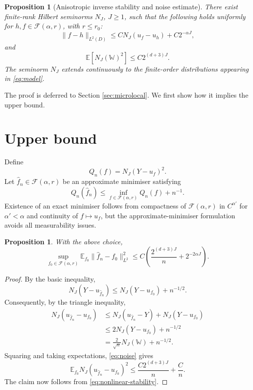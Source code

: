 \documentclass[11pt,a4paper]{article}
\newtheorem{proposition}[theorem]{Proposition}
\theoremstyle{remark}
\numberwithin{equation}{section}
\newcommand{\E}{\mathbb{E}}
\newcommand{\W}{\mathbb{W}}
\newcommand{\Fcal}{\mathcal F}
\begin{document}
\begin{proposition}[Anisotropic inverse stability and noise estimate]
\label{prop:anisotropic}
There exist finite-rank Hilbert seminorms $N_J$, $J\geq 1$, such that the
following holds uniformly for $h,f\in\Fcal(\alpha,r)$, with $r\leq r_0$:
\begin{equation}\label{eq:nonlinear-stability}
\|f-h\|_{L^2(D)}
\leq
C N_J(u_f-u_h)+C2^{-\alpha J},
\end{equation}
and
\begin{equation}\label{eq:noise}
\E\!\left[N_J(\W)^2\right]\leq C2^{(d+3)J}.
\end{equation}
The seminorm $N_J$ extends continuously to the finite-order distributions
appearing in \eqref{eq:model}.
\end{proposition}

The proof is deferred to Section \ref{sec:microlocal}. We first show how it
implies the upper bound.

\section{Upper bound}

Define
\[
Q_n(f)=N_J(Y-u_f)^2.
\]
Let $\widehat f_n\in\Fcal(\alpha,r)$ be an approximate minimiser satisfying
\[
Q_n(\widehat f_n)\leq \inf_{f\in\Fcal(\alpha,r)}Q_n(f)+n^{-1}.
\]
Existence of an exact minimiser follows from compactness of
$\Fcal(\alpha,r)$ in $C^{\alpha'}$ for $\alpha'<\alpha$ and continuity of
$f\mapsto u_f$, but the approximate-minimiser formulation avoids all
measurability issues.

\begin{proposition}\label{prop:upper}
With the above choice,
\[
\sup_{f_0\in\Fcal(\alpha,r)}
\E_{f_0}\|\widehat f_n-f_0\|_{L^2}^2
\leq
C\left(
\frac{2^{(d+3)J}}n+2^{-2\alpha J}
\right).
\]
\end{proposition}

\begin{proof}
By the basic inequality,
\[
N_J(Y-u_{\widehat f_n})
\leq
N_J(Y-u_{f_0})+n^{-1/2}.
\]
Consequently, by the triangle inequality,
\begin{align*}
N_J(u_{\widehat f_n}-u_{f_0})
&\leq
N_J(u_{\widehat f_n}-Y)+N_J(Y-u_{f_0})\\
&\leq
2N_J(Y-u_{f_0})+n^{-1/2}\\
&=
\frac2{\sqrt n}N_J(\W)+n^{-1/2}.
\end{align*}
Squaring and taking expectations, \eqref{eq:noise} gives
\[
\E_{f_0}N_J(u_{\widehat f_n}-u_{f_0})^2
\leq
\frac{C2^{(d+3)J}}n+\frac Cn.
\]
The claim now follows from \eqref{eq:nonlinear-stability}.
\end{proof}
\end{document}
